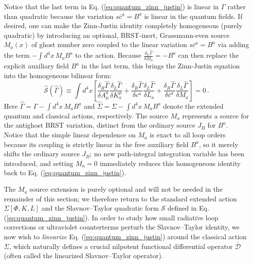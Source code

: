 Notice that the last term in Eq. (\ref{eq:quantum_zinn_justin}) is linear in \(\Gamma\) rather than quadratic because the variation \(s\bar{c}^a = B^a\) is linear in the quantum fields. If desired, one can make the Zinn-Justin identity completely homogeneous (purely quadratic) by introducing an optional, BRST-inert, Grassmann-even source \(M_a(x)\) of ghost number zero coupled to the linear variation \(s\bar{c}^a = B^a\) via adding the term \(-\int d^4x \, M_a B^a\) to the action. Because \(\frac{\delta_L \widehat{\Gamma}}{\delta M_a} = -B^a\) can then replace the explicit auxiliary field \(B^a\) in the last term, this brings the Zinn-Justin equation into the homogeneous bilinear form:
\begin{equation} \label{eq:homogeneous_zinn_justin}
    \widehat{\mathcal{S}}(\widehat{\Gamma}) \equiv \int d^4x \left[ \frac{\delta_R \widehat{\Gamma}}{\delta A_\mu^a} \frac{\delta_L \widehat{\Gamma}}{\delta K_a^\mu} + \frac{\delta_R \widehat{\Gamma}}{\delta c^a} \frac{\delta_L \widehat{\Gamma}}{\delta L_a} + \frac{\delta_R \widehat{\Gamma}}{\delta \bar{c}^a} \frac{\delta_L \widehat{\Gamma}}{\delta M_a} \right] = 0 \, .
\end{equation}
Here \(\widehat{\Gamma} = \Gamma - \int d^4x \, M_a B^a\) and \(\widehat{\Sigma} = \Sigma - \int d^4x \, M_a B^a\) denote the extended quantum and classical actions, respectively. The source \(M_a\) represents a source for the antighost BRST variation, distinct from the ordinary source \(J_B\) for \(B^a\). Notice that the simple linear dependence on \(M_a\) is exact to all loop orders because its coupling is strictly linear in the free auxiliary field \(B^a\), so it merely shifts the ordinary source \(J_B\); no new path-integral integration variable has been introduced, and setting \(M_a = 0\) immediately reduces this homogeneous identity back to Eq. (\ref{eq:quantum_zinn_justin}).

The \(M_a\) source extension is purely optional and will not be needed in the remainder of this section; we therefore return to the standard extended action \(\Sigma[\Phi, K, L]\) and the Slavnov--Taylor quadratic form \(\mathcal{S}\) defined in Eq. (\ref{eq:quantum_zinn_justin}). In order to study how small radiative loop corrections or ultraviolet counterterms perturb the Slavnov--Taylor identity, we now wish to \textit{linearize} Eq. (\ref{eq:quantum_zinn_justin}) around the classical action \(\Sigma\), which naturally defines a crucial nilpotent functional differential operator \(\overline{\mathcal{D}}\) (often called the linearized Slavnov--Taylor operator).

